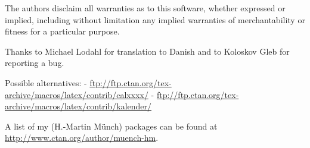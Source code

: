 \documentclass{article}
\begin{document}
The authors disclaim all warranties as to this software, whether expressed or
implied, including without limitation any implied warranties of
merchantability or fitness for a particular purpose.

Thanks to Michael Lodahl for translation to Danish and to Koloskov Gleb for
reporting a bug.\newline

\noindent Possible alternatives:\newline
- \url{ftp://ftp.ctan.org/tex-archive/macros/latex/contrib/calxxxx/}\newline
- \url{ftp://ftp.ctan.org/tex-archive/macros/latex/contrib/kalender/}\newline

\noindent A list of my (H.-Martin M\"{u}nch) packages can be found at\newline
\url{http://www.ctan.org/author/muench-hm}.
\end{document}
